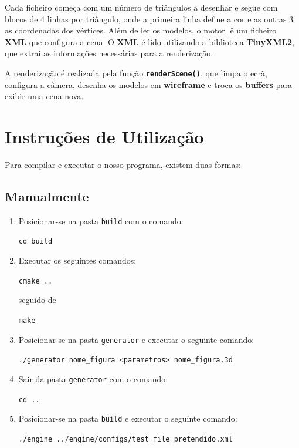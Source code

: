 \documentclass[12pt,a4paper]{report}%
\begin{document}
Cada ficheiro começa com um número de triângulos a desenhar e segue com blocos de 4 linhas por triângulo, onde a primeira linha define a cor e as outras 3 as coordenadas dos vértices. Além de ler os modelos, o motor lê um ficheiro \textbf{XML} que configura a cena. O \textbf{XML} é lido utilizando a biblioteca \textbf{TinyXML2}, que extrai as informações necessárias para a renderização. 

A renderização é realizada pela função \textbf{\texttt{renderScene()}}, que limpa o ecrã, configura a câmera, desenha os modelos em \textbf{wireframe} e troca os \textbf{buffers} para exibir uma cena nova. 





\chapter{Instruções de Utilização}\label{chap:instructions}

Para compilar e executar o nosso programa, existem duas formas:

\section{Manualmente}

\begin{enumerate}
    \item Posicionar-se na pasta \texttt{build} com o comando:
    \begin{center}
        \texttt{cd build}
    \end{center}
    \item Executar os seguintes comandos:
    \begin{center}
        \texttt{cmake ..} 
    \end{center}
    seguido de
    \begin{center}
        \texttt{make}
    \end{center}
    \item Posicionar-se na pasta \texttt{generator} e executar o seguinte comando:
    \begin{center}
        \texttt{./generator nome\_figura <parametros> nome\_figura.3d}
    \end{center}
    \item Sair da pasta \texttt{generator} com o comando:
    \begin{center}
        \texttt{cd ..}
    \end{center}
    \item Posicionar-se na pasta \texttt{build} e executar o seguinte comando:
    \begin{center}
        \texttt{./engine ../engine/configs/test\_file\_pretendido.xml}
    \end{center}
\end{enumerate}
\end{document}
